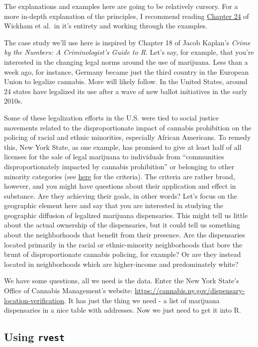 \documentclass[
  letterpaper,
]{book}
\begin{document}
The explanations and examples here are going to be relatively cursory.
For a more in-depth explanation of the principles, I recommend reading
\href{https://r4ds.hadley.nz/webscraping}{Chapter 24} of Wickham et
al.~in it's entirety and working through the examples.

The case study we'll use here is inspired by Chapter 18 of Jacob
Kaplan's \emph{Crime by the Numbers: A Criminologist's Guide to R}.
Let's say, for example, that you're interested in the changing legal
norms around the use of marijuana. Less than a week ago, for instance,
Germany became just the third country in the European Union to legalize
cannabis. More will likely follow. In the United States, around 24
states have legalized its use after a wave of new ballot initiatives in
the early 2010s.

Some of these legalization efforts in the U.S. were tied to social
justice movements related to the disproportionate impact of cannabis
prohibition on the policing of racial and ethnic minorities, especially
African Americans. To remedy this, New York State, as one example, has
promised to give at least half of all licenses for the sale of legal
marijuana to individuals from ``communities disproportionately impacted
by cannabis prohibition'' or belonging to other minority categories (see
\href{https://cannabis.ny.gov/social-and-economic-equity}{here} for the
criteria). The criteria are rather broad, however, and you might have
questions about their application and effect in substance. Are they
achieving their goals, in other words? Let's focus on the geographic
element here and say that you are interested in studying the geographic
diffusion of legalized marijuana dispensaries. This might tell us little
about the actual ownership of the dispensaries, but it could tell us
something about the neighborhoods that benefit from their presence. Are
the dispensaries located primarily in the racial or ethnic-minority
neighborhoods that bore the brunt of disproportionate cannabis policing,
for example? Or are they instead located in neighborhoods which are
higher-income and predominately white?

We have some questions, all we need is the data. Enter the New York
State's Office of Cannabis Management's website:
\url{https://cannabis.ny.gov/dispensary-location-verification}. It has
just the thing we need - a list of marijuana dispensaries in a nice
table with addresses. Now we just need to get it into R.

\hypertarget{using-rvest}{%
\subsection{\texorpdfstring{Using
\texttt{rvest}}{Using rvest}}\label{using-rvest}}
\end{document}
